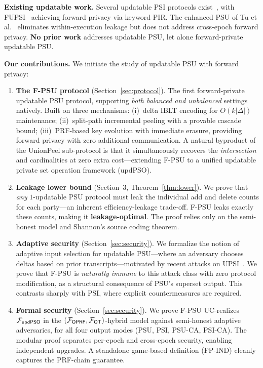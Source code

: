 \documentclass[letterpaper,twocolumn,10pt]{article}
\theoremstyle{definition}
\begin{document}
\textbf{Existing updatable work.} Several updatable PSI protocols
exist~\cite{BMX22,BMS+24,LMR+26,ABF+25,LTS+26}, with FUPSI~\cite{WZC+24}
achieving forward privacy via keyword PIR. The enhanced PSU of Tu et
al.~\cite{Tu+25} eliminates within-execution leakage but does not address
cross-epoch forward privacy. \textbf{No prior work} addresses updatable PSU,
let alone forward-private updatable PSU.

\textbf{Our contributions.} We initiate the study of updatable PSU with forward
privacy:

\begin{enumerate}
\item \textbf{The F-PSU protocol} (Section~\ref{sec:protocol}). The first
forward-private updatable PSU protocol, supporting \emph{both balanced and
unbalanced} settings natively. Built on three mechanisms: (i)~delta IBLT
encoding for $O(k|\Delta|)$ maintenance; (ii)~split-path incremental peeling
with a provable cascade bound; (iii)~PRF-based key evolution with immediate
erasure, providing forward privacy with zero additional communication.
A natural byproduct of the UnionPeel sub-protocol is that it simultaneously
recovers the \emph{intersection} and cardinalities at zero extra
cost---extending F-PSU to a unified updatable private set operation
framework (updPSO).

\item \textbf{Leakage lower bound} (Section~3, Theorem~\ref{thm:lower}). We prove that
\emph{any} $1$-updatable PSU protocol must leak the individual add and delete
counts for each party---an inherent efficiency-leakage trade-off. F-PSU leaks
exactly these counts, making it \textbf{leakage-optimal}. The proof relies
only on the semi-honest model and Shannon's source coding theorem.

\item \textbf{Adaptive security} (Section~\ref{sec:security}). We formalize
the notion of adaptive input selection for updatable PSU---where an adversary
chooses deltas based on prior transcripts---motivated by recent attacks on
UPSI~\cite{LMR+26}. We prove that F-PSU is \emph{naturally immune} to this
attack class with zero protocol modification, as a structural consequence of
PSU's superset output. This contrasts sharply with PSI, where explicit
countermeasures are required.

\item \textbf{Formal security} (Section~\ref{sec:security}). We prove F-PSU
UC-realizes~\cite{Can01} $\mathcal{F}_{\mathsf{updPSO}}$ in the $(\mathcal{F}_{\mathsf{OPRF}},
\mathcal{F}_{\mathsf{OT}})$-hybrid model against semi-honest adaptive adversaries,
for all four output modes (PSU, PSI, PSU-CA, PSI-CA). The modular proof
separates per-epoch and cross-epoch security, enabling independent upgrades.
A standalone game-based definition (FP-IND) cleanly captures the PRF-chain
guarantee.


\end{enumerate}
\end{document}
